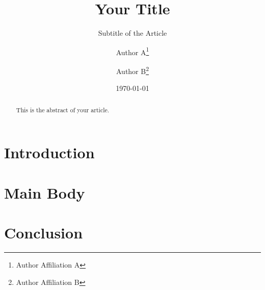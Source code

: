 \documentclass{scrartcl}
\title{Your Title}
\subtitle{Subtitle of the Article}
\author{Author A\thanks{Author Affiliation A} \and Author B\thanks{Author Affiliation B}}
\date{\today}
\begin{document}
\maketitle



\begin{abstract}
This is the abstract of your article.
\end{abstract}

\tableofcontents

\section{Introduction}
\label{sec:intro}
\lipsum[1-2] %

\section{Main Body}
\label{sec:main}
\lipsum[3-4] %

\section{Conclusion}
\label{sec:conclusion}
\lipsum[5] %

\nocite{*}


\end{document}
